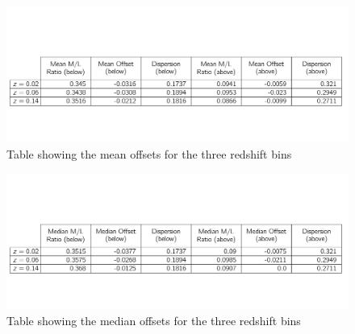 \begin{figure}
\includegraphics[width=\textwidth]{figures/table.pdf}
\caption[Table showing the mean offsets for the three redshift bins.]
{Table showing the mean offsets for the three redshift bins
\label{tab: mean_offsets}}
\end{figure}


\begin{figure}
\includegraphics[width=\textwidth]{figures/table_median.pdf}
\caption[Table showing the median offsets for the three redshift bins.]
{Table showing the median offsets for the three redshift bins
\label{tab: median_offsets}}
\end{figure}

